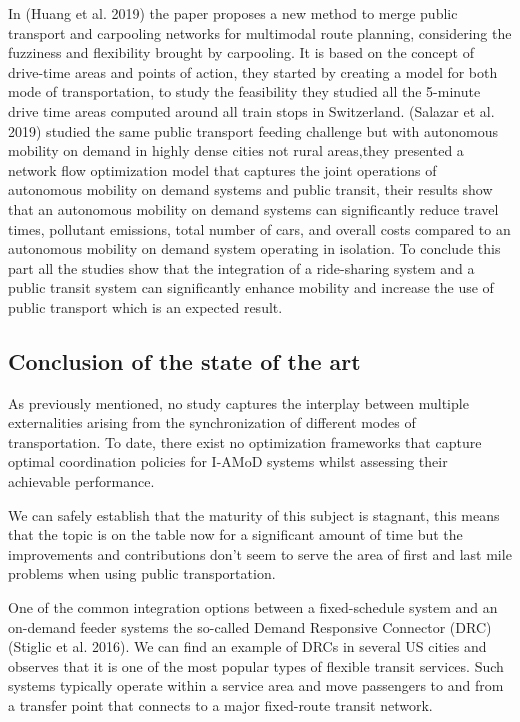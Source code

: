 \documentclass{article}
\begin{document}
In (Huang et al. 2019)\citep{Huang_2019} the paper proposes a new method to merge public transport and carpooling networks for multimodal route planning, considering the fuzziness and flexibility brought by carpooling. It is based on the concept of drive-time areas and points of action, they started by creating a model for both mode of transportation, to study the feasibility they studied all the 5-minute drive time areas computed around all train stops in Switzerland. (Salazar et al. 2019)\cite{Salazar_schiffer} studied the same public transport feeding challenge but with autonomous mobility on demand in highly dense cities not rural areas,they presented a network flow optimization model that captures the joint operations of  autonomous mobility on demand systems
and public transit, their results show that an  autonomous mobility on demand systems can significantly reduce travel times, pollutant emissions, total number of cars, and overall costs compared to an  autonomous mobility on demand system operating in isolation.
To conclude this part all the studies show that the integration of a ride-sharing system and a public transit system can significantly enhance mobility and increase the use of public transport which is an expected result.


\subsection{Conclusion of the state of the art}
\label{subsec:literature_part3}
 
As previously mentioned, no study captures the interplay between multiple externalities arising from the synchronization of different modes of transportation.
To date, there exist no optimization frameworks that capture optimal coordination policies for I-AMoD systems whilst assessing their achievable performance. \cite{Salazar_schiffer}

We can safely establish that the maturity of this subject is stagnant, this means that the topic is on the table now for a significant amount of time but the improvements and contributions don\rq{}t seem to serve the area of first and last mile problems when using public transportation.

One of the common integration options between a fixed-schedule system and an on-demand feeder systems the so-called Demand Responsive Connector (DRC) (Stiglic et al. 2016)\citep{STIGLIC201812}. We can find an example of DRCs in
several US cities and observes that it is one of the most popular types of flexible transit services. Such systems typically operate within a service area and move passengers to and from a transfer point that connects to a major fixed-route transit network.
\end{document}
